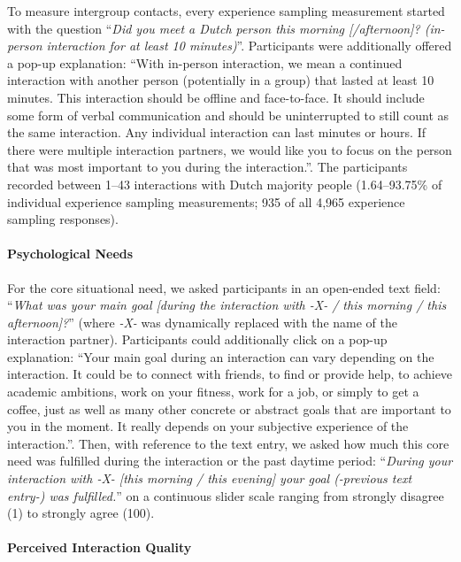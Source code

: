 \documentclass[man, 12pt, a4paper, mask]{apa7}
\theoremstyle{break}
\theoremstyle{plain}
\begin{document}
To measure intergroup contacts, every experience sampling measurement
started with the question
``\textit{Did you meet a Dutch person this morning [/afternoon]? (in-person interaction for at least 10 minutes)}''.
Participants were additionally offered a pop-up explanation: ``With
in-person interaction, we mean a continued interaction with another
person (potentially in a group) that lasted at least 10 minutes. This
interaction should be offline and face-to-face. It should include some
form of verbal communication and should be uninterrupted to still count
as the same interaction. Any individual interaction can last minutes or
hours. If there were multiple interaction partners, we would like you to
focus on the person that was most important to you during the
interaction.''. The participants recorded between 1--43 interactions
with Dutch majority people (1.64--93.75\% of individual experience
sampling measurements; 935 of all 4,965 experience sampling responses).

\paragraph{Psychological Needs}

For the core situational need, we asked participants in an open-ended
text field:
``\textit{What was your main goal [during the interaction with -X- / this morning / this afternoon]?}''
(where \textit{-X-} was dynamically replaced with the name of the
interaction partner). Participants could additionally click on a pop-up
explanation: ``Your main goal during an interaction can vary depending
on the interaction. It could be to connect with friends, to find or
provide help, to achieve academic ambitions, work on your fitness, work
for a job, or simply to get a coffee, just as well as many other
concrete or abstract goals that are important to you in the moment. It
really depends on your subjective experience of the interaction.''.
Then, with reference to the text entry, we asked how much this core need
was fulfilled during the interaction or the past daytime period:
``\textit{During your interaction with -X- [this morning / this evening] your goal (-previous text entry-) was fulfilled.}''
on a continuous slider scale ranging from strongly disagree (1) to
strongly agree (100).

\paragraph{Perceived Interaction Quality}
\end{document}
